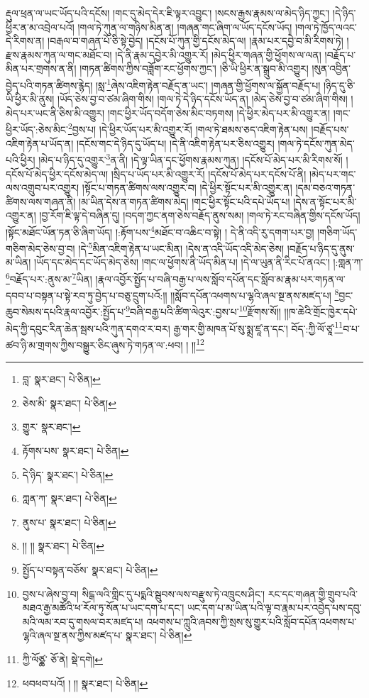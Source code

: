 རྡུལ་ཕྲན་ལ་ཡང་ཡོད་པའི་དངོས། །གང་དུ་མེད་དེར་ཇི་ལྟར་འབྱུང་། །སངས་རྒྱས་རྣམས་ལ་མེད་ཉིད་ཀྱང་། །དེ་ཉིད་ཕྱིར་ན་མ་འབྲེལ་པའོ། །གལ་ཏེ་ཀུན་ལ་གཉིས་མིན་ན། །གཞན་གང་ཞིག་ལ་ཡོད་དངོས་ཡོད། །གལ་ཏེ་ཁྱོད་ལའང་དེ་རིགས་ན། །བརྒལ་བ་གཞན་པོ་ཅི་སྟེ་བྱེད། །དངོས་པོ་ཀུན་གྱི་དངོས་མེད་ལ། །རྣམ་པར་དབྱེ་བ་མི་རིགས་ཏེ། །རྫས་རྣམས་ཀུན་ལ་གང་མཐོང་བ། །དེ་ནི་རྣམ་དབྱེར་མི་འགྱུར་རོ། །མེད་ཕྱིར་གཞན་གྱི་ཕྱོགས་ལ་ལན། །བརྗོད་པ་མིན་པར་གྲགས་ན་ནི། །གཏན་ཚིགས་ཀྱིས་བཟློག་རང་ཕྱོགས་ཀྱང་། །ཅི་ཡི་ཕྱིར་ན་སྒྲུབ་མི་འགྱུར། །སུན་འབྱིན་བྱེད་པའི་གཏན་ཚིགས་རྙེད། །སླ་\footnote{བླ་  སྣར་ཐང་།  པེ་ཅིན། }ཞེས་འཇིག་རྟེན་བརྗོད་ན་ཡང་། །གཞན་གྱི་ཕྱོགས་ལ་སྐྱོན་བརྗོད་པ། །ཉིད་དུ་ཅི་ཡི་ཕྱིར་མི་ནུས། །ཡོད་ཅེས་བྱ་བ་ཙམ་ཞིག་གིས། །གལ་ཏེ་དེ་ཉིད་དངོས་ཡོད་ན། །མེད་ཅེས་བྱ་བ་ཙམ་ཞིག་གིས། །མེད་པར་ཡང་ནི་ཅིས་མི་འགྱུར། །གང་ཕྱིར་ཡོད་བདོག་ཅེས་མིང་བཏགས། །དེ་ཕྱིར་མེད་པར་མི་འགྱུར་ན། །གང་ཕྱིར་ཡོད་:ཅེས་མིང་\footnote{ཅེས་མི་  སྣར་ཐང་།  པེ་ཅིན། }བྱས་པ། །དེ་ཕྱིར་ཡོད་པར་མི་འགྱུར་རོ། །གལ་ཏེ་ཐམས་ཅད་འཇིག་རྟེན་པས། །བརྗོད་པས་འཇིག་རྟེན་པ་ཡོད་ན། །དངོས་གང་དེ་ཉིད་དུ་ཡོད་པ། །དེ་ནི་འཇིག་རྟེན་པར་ཅིས་འགྱུར། །གལ་ཏེ་དངོས་ཀུན་མེད་པའི་ཕྱིར། །མེད་པ་ཉིད་དུ་འགྱུར་\footnote{གྱུར་  སྣར་ཐང་། }ན་ནི། །དེ་ལྟ་ཡིན་དང་ཕྱོགས་རྣམས་ཀུན། །དངོས་པོ་མེད་པར་མི་རིགས་སོ། །དངོས་པོ་མེད་ཕྱིར་དངོས་མེད་ལ། །སྲིད་པ་ཡོད་པར་མི་འགྱུར་རོ། །དངོས་པོ་མེད་པར་དངོས་པོ་ནི། །མེད་པར་གང་ལས་འགྲུབ་པར་འགྱུར། །སྟོང་པ་གཏན་ཚིགས་ལས་འགྱུར་བ། །དེ་ཕྱིར་སྟོང་པར་མི་འགྱུར་ན། །དམ་བཅའ་གཏན་ཚིགས་ལས་གཞན་ནི། །མ་ཡིན་དེས་ན་གཏན་ཚིགས་མེད། །གང་ཕྱིར་སྟོང་པའི་དཔེ་ཡོད་པ། །དེས་ན་སྟོང་པར་མི་འགྱུར་ན། །བྱ་རོག་ཇི་ལྟ་དེ་བཞིན་དུ། །བདག་ཀྱང་ནག་ཅེས་བརྗོད་ནུས་སམ། །གལ་ཏེ་རང་བཞིན་གྱིས་དངོས་ཡོད། །སྟོང་མཐོང་ཡོན་ཏན་ཅི་ཞིག་ཡོད། །:རྟོག་པས་\footnote{རྟོགས་པས་  སྣར་ཐང་།  པེ་ཅིན། }མཐོང་བ་འཆིང་བ་སྟེ། །
དེ་ནི་འདི་རུ་དགག་པར་བྱ། །གཅིག་ཡོད་གཅིག་མེད་ཅེས་བྱ་བ། །དེ་\footnote{དེ་ཉིད་  སྣར་ཐང་།  པེ་ཅིན། }མིན་འཇིག་རྟེན་པ་ཡང་མིན། །དེས་ན་འདི་ཡོད་འདི་མེད་ཅེས། །བརྗོད་པ་ཉིད་དུ་ནུས་མ་ཡིན། །ཡོད་དང་མེད་དང་ཡོད་མེད་ཅེས། །གང་ལ་ཕྱོགས་ནི་ཡོད་མིན་པ། །དེ་ལ་ཡུན་ནི་རིང་པོ་ནའང་། །:གླན་ཀ་\footnote{ཀླན་ཀ་  སྣར་ཐང་།  པེ་ཅིན། }བརྗོད་པར་:ནུས་མ་\footnote{ནུས་པ་  སྣར་ཐང་།  པེ་ཅིན། }ཡིན། །རྣལ་འབྱོར་སྤྱོད་པ་བཞི་བརྒྱ་པ་ལས་སློབ་དཔོན་དང་སློབ་མ་རྣམ་པར་གཏན་ལ་དབབ་པ་བསྟན་པ་སྟེ་རབ་ཏུ་བྱེད་པ་བཅུ་དྲུག་པའོ:།། །།སློབ་དཔོན་འཕགས་པ་ལྷའི་ཞལ་སྔ་ནས་མཛད་པ། \footnote{།། །།  སྣར་ཐང་།  པེ་ཅིན། }བྱང་ཆུབ་སེམས་དཔའི་རྣལ་འབྱོར་:སྤྱོད་པ་\footnote{སྤྱོད་པ་བསྟན་བཅོས་  སྣར་ཐང་།  པེ་ཅིན། }བཞི་བརྒྱ་པའི་ཚིག་ལེའུར་:བྱས་པ་\footnote{བྱས་པ་ཞེས་བྱ་བ། སིངྒ་ལའི་གླིང་དུ་པདྨའི་སྦུབས་ལས་བརྫུས་ཏེ་འཁྲུངས་ཤིང་། རང་དང་གཞན་གྱི་གྲུབ་པའི་མཐའ་རྒྱ་མཚོའི་ཕ་རོལ་ཏུ་སོན་པ་ཡང་དག་པ་དང་། ཡང་དག་པ་མ་ཡིན་པའི་ལྟ་བ་རྣམ་པར་འབྱེད་པས་དབུ་མའི་ལམ་རབ་དུ་གསལ་བར་མཛད་པ། འཕགས་པ་ཀླུའི་ཞབས་ཀྱི་སྲས་སུ་གྱུར་པའི་སློབ་དཔོན་འཕགས་པ་ལྷའི་ཞལ་སྔ་ནས་ཀྱིས་མཛད་པ་  སྣར་ཐང་།  པེ་ཅིན། }རྫོགས་སོ།། །།ཁ་ཆེའི་གྲོང་ཁྱེར་དཔེ་མེད་ཀྱི་དབུང་རིན་ཆེན་སྦས་པའི་ཀུན་དགའ་ར་བར། རྒྱ་གར་གྱི་མཁན་པོ་སུ་སྨྲ་ཛཱ་ན་དང་། བོད་:ཀྱི་ལོ་ཙཱ་\footnote{ཀྱི་ལོཙྪ་  ཅོ་ནེ།  སྡེ་དགེ། }བ་པ་ཚབ་ཉི་མ་གྲགས་ཀྱིས་བསྒྱུར་ཅིང་ཞུས་ཏེ་གཏན་ལ་:ཕབ། ། །།\footnote{ཕབཕབ་པའོ། ། །།  སྣར་ཐང་།  པེ་ཅིན། }
